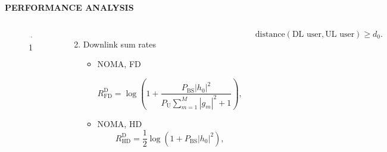 \documentclass[aspectratio=169]{beamer}
\begin{document}
\begin{frame}{\textbf{{\LARGE{P}}ERFORMANCE {\LARGE{A}}NALYSIS}}
	
	\begin{columns}
		\begin{figure}
			\centering
			\includegraphics[width=1\linewidth]{images/fig1.pdf}
			\caption{1}
		\end{figure}
		
		\begin{enumerate}\setcounter{enumi}{1}
			\item Downlink sum rates 
			\begin{itemize}
				\item  NOMA, FD
				
				\begin{equation}
					R_{\text{FD}}^{\text{D}} = \log\left( 1 + \frac{P_{\text{BS}}\left\vert h_0\right\vert^2}{P_{\text{U}}\sum_{m=1}^M\left\vert g_m\right\vert^2+1}  \right),
				\end{equation}
				\item NOMA, HD
				\begin{equation}
					R_{\text{HD}}^{\text{D}} = \frac{1}{2}\log\left( 1 + P_{\text{BS}}\left\vert h_0 \right\vert^2 \right),
				\end{equation}
			\end{itemize}
		\end{enumerate}

		\begin{equation*}
		\mathrm{distance}(\text{DL user}, \text{UL user}) \geqslant d_0.
	\end{equation*}
	
	\end{columns}

\end{frame}
\end{document}
